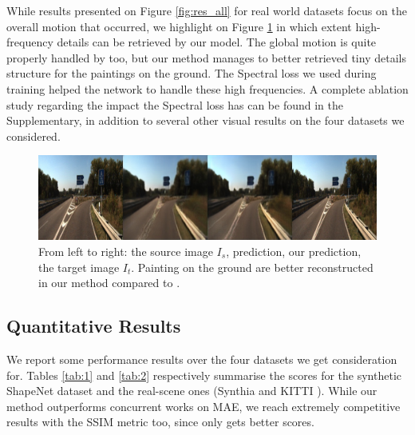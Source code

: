 While results presented on Figure \ref{fig:res_all} for real world datasets focus on the overall motion that occurred, we highlight on Figure \ref{fig:res_all2} in which extent high-frequency details can be retrieved by our model. The global motion is quite properly handled by \citep{kim2020novel} too, but our method manages to better retrieved tiny details structure for the paintings on the ground. The Spectral loss we used during training helped the network to handle these high frequencies. A complete ablation study regarding the impact the Spectral loss has can be found in the Supplementary, in addition to several other visual results on the four datasets we considered.
\begin{figure}[h!]
    \begin{center}
    \includegraphics[width=.8\textwidth]{images/epipolarnvs/rebbutal_KITTI_3.jpg}
    \end{center}
     \caption{From left to right: the source image  $I_s$, \citep{kim2020novel} prediction, our prediction, the target image $I_t$. Painting on the ground are better reconstructed in our method compared to \citep{kim2020novel}.}
     \label{fig:res_all2}
\end{figure}

  
\subsection{Quantitative Results }

We report some performance results over the four datasets we get consideration for. Tables \ref{tab:1} and \ref{tab:2} respectively summarise the scores for the synthetic ShapeNet \citep{chang2015shapenet} dataset and the real-scene ones (Synthia \citep{ros2016synthia} and KITTI \citep{geiger2012we}). While our method outperforms concurrent works on MAE, we reach extremely competitive results with the SSIM metric too, since only \citep{sun2018multiview} gets better scores. \newline

